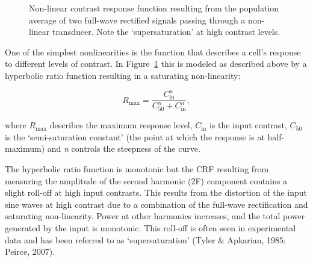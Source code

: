 \documentclass[
  letterpaper,
  DIV=11,
  numbers=noendperiod]{scrartcl}
\begin{document}
\begin{figure}


\caption{\label{fig-contrastresponsefunction}Non-linear contrast
response function resulting from the population average of two full-wave
rectified signals passing through a non-linear transducer. Note the
`supersaturation' at high contrast levels.}

\end{figure}%

One of the simplest nonlinearities is the function that describes a
cell's response to different levels of contrast. In
Figure~\ref{fig-contrastresponsefunction} this is modeled as described
above by a hyperbolic ratio function resulting in a saturating
non-linearity:

\begin{equation}
R_{\mathrm{max}} = \frac{C_{\mathrm{in}}^n}{C_{50}^n + C_{\mathrm{in}}^n},
\end{equation}

where \({R_{\mathrm{max}}}\) describes the maximum response level,
\(C_{\mathrm{in}}\) is the input contrast, \(C_{50}\) is the
`semi-saturation constant' (the point at which the response is at
half-maximum) and \emph{n} controls the steepness of the curve.

The hyperbolic ratio function is monotonic but the CRF resulting from
measuring the amplitude of the second harmonic (2F) component contains a
slight roll-off at high input contrasts. This results from the
distortion of the input sine waves at high contrast due to a combination
of the full-wave rectification and saturating non-linearity. Power at
other harmonics increases, and the total power generated by the input is
monotonic. This roll-off is often seen in experimental data and has been
referred to as `supersaturation' (Tyler \& Apkarian, 1985; Peirce,
2007).
\end{document}
